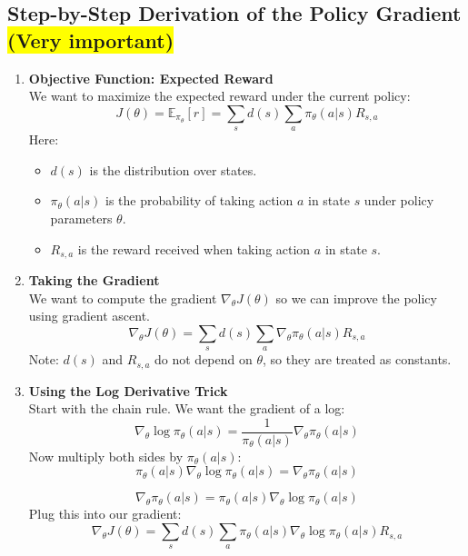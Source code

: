 \documentclass[12pt]{article}
\begin{document}
\subsection{Step-by-Step Derivation of the Policy Gradient \colorbox{yellow}{(Very important)}}
\label{sec:policy_gradient_derivation}
\begin{enumerate}
    \item \textbf{Objective Function: Expected Reward} \\
    We want to maximize the expected reward under the current policy:
    \begin{equation}
    J(\theta) = \mathbb{E}_{\pi_\theta}[r] = \sum_{s} d(s) \sum_{a} \pi_\theta(a|s) R_{s,a}
    \end{equation}
    Here:
    \begin{itemize}
        \item $d(s)$ is the distribution over states.
        \item $\pi_\theta(a|s)$ is the probability of taking action $a$ in state $s$ under policy parameters $\theta$.
        \item $R_{s,a}$ is the reward received when taking action $a$ in state $s$.
    \end{itemize}

    \item \textbf{Taking the Gradient} \\
    We want to compute the gradient $\nabla_\theta J(\theta)$ so we can improve the policy using gradient ascent.
    \begin{equation}
    \nabla_\theta J(\theta) = \sum_{s} d(s) \sum_{a} \nabla_\theta \pi_\theta(a|s) R_{s,a}
    \end{equation}
    Note: $d(s)$ and $R_{s,a}$ do not depend on $\theta$, so they are treated as constants.

    \item \textbf{Using the Log Derivative Trick} \\
    Start with the chain rule. We want the gradient of a log:
    \[
    \nabla_\theta \log \pi_\theta(a|s) = \frac{1}{\pi_\theta(a|s)}\nabla_\theta \pi_\theta(a|s)
    \]
    Now multiply both sides by $\pi_\theta(a|s)$:
    \[
    \pi_\theta(a|s)\nabla_\theta \log \pi_\theta(a|s) = \nabla_\theta \pi_\theta(a|s)
    \]

    \begin{equation}
    \nabla_\theta \pi_\theta(a|s) = \pi_\theta(a|s) \nabla_\theta \log \pi_\theta(a|s)
    \end{equation}
    Plug this into our gradient:
    \begin{equation}
    \nabla_\theta J(\theta) = \sum_{s} d(s) \sum_{a} \pi_\theta(a|s) \nabla_\theta \log \pi_\theta(a|s) R_{s,a}
    \end{equation}


\end{enumerate}
\end{document}
